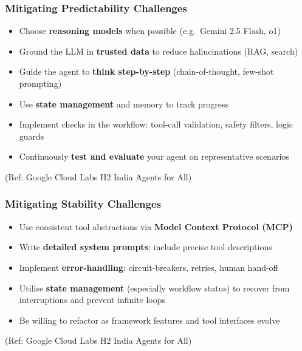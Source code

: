 \begin{frame}[fragile]\frametitle{Mitigating Predictability Challenges}
    \begin{itemize}
        \item Choose \textbf{reasoning models} when possible (e.g.\ Gemini 2.5 Flash, o1)
        \item Ground the LLM in \textbf{trusted data} to reduce hallucinations (RAG, search)
        \item Guide the agent to \textbf{think step-by-step} (chain-of-thought, few-shot prompting)
        \item Use \textbf{state management} and memory to track progress
        \item Implement checks in the workflow: tool-call validation, safety filters, logic guards
        \item Continuously \textbf{test and evaluate} your agent on representative scenarios
    \end{itemize}
        {\tiny (Ref: Google Cloud Labs H2 India Agents for All)}
\end{frame}

\begin{frame}[fragile]\frametitle{Mitigating Stability Challenges}
    \begin{itemize}
        \item Use consistent tool abstractions via \textbf{Model Context Protocol (MCP)}
        \item Write \textbf{detailed system prompts}; include precise tool descriptions
        \item Implement \textbf{error-handling}: circuit-breakers, retries, human hand-off
        \item Utilise \textbf{state management} (especially workflow status) to recover from interruptions and prevent infinite loops
        \item Be willing to refactor as framework features and tool interfaces evolve
    \end{itemize}
        {\tiny (Ref: Google Cloud Labs H2 India Agents for All)}
\end{frame}

